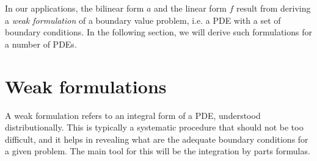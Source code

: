 In our applications, the bilinear form $a$ and the linear form $f$ result from deriving a \emph{weak formulation} of a boundary value problem, i.e. a PDE with a set of boundary conditions. In the following section, we will derive such formulations for a number of PDEs. 

\section{Weak formulations}\label{sec:weak-formulations}
A weak formulation refers to an integral form of a PDE, understood distributionally. This is typically a systematic procedure that should not be too difficult, and it helps in revealing what are the adequate boundary conditions for a given problem. The main tool for this will be the integration by parts formulas. 

